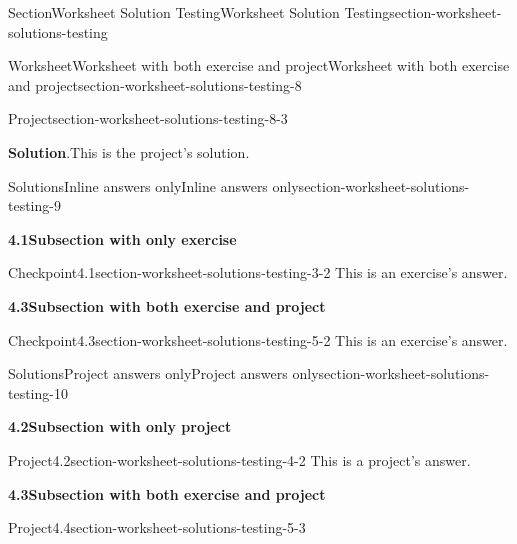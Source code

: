 \documentclass[oneside,10pt,]{article}
\newcommand{\blocktitlefont}{\relax}
\numberwithin{equation}{section}
\begin{document}
\begin{sectionptx}{Section}{Worksheet Solution Testing}{}{Worksheet Solution Testing}{}{}{section-worksheet-solutions-testing}
\begin{worksheet-subsection}{Worksheet}{Worksheet with both exercise and project}{}{Worksheet with both exercise and project}{}{}{section-worksheet-solutions-testing-8}
\begin{project}{Project}{}{section-worksheet-solutions-testing-8-3}
\par\smallskip%
\noindent\textbf{\blocktitlefont Solution}.\hypertarget{section-worksheet-solutions-testing-8-3-3}{}\quad{}This is the project's solution.%
\end{project}%
\end{worksheet-subsection}
\restoregeometry
%
%
\typeout{************************************************}
\typeout{************************************************}
%
\begin{solutions-subsection}{Solutions}{Inline answers only}{}{Inline answers only}{}{}{section-worksheet-solutions-testing-9}
\par\medskip
\noindent\textbf{\normalsize{}4.1\space\textperiodcentered\space{}Subsection with only exercise}
\begin{inlinesolution}{Checkpoint}{4.1}{}{section-worksheet-solutions-testing-3-2}%
\noindent\hypertarget{section-worksheet-solutions-testing-3-2-2-main}{}This is an exercise's answer.%
\end{inlinesolution}%
\par\medskip
\noindent\textbf{\normalsize{}4.3\space\textperiodcentered\space{}Subsection with both exercise and project}
\begin{inlinesolution}{Checkpoint}{4.3}{}{section-worksheet-solutions-testing-5-2}%
\noindent\hypertarget{section-worksheet-solutions-testing-5-2-2-main}{}This is an exercise's answer.%
\end{inlinesolution}%
\end{solutions-subsection}
%
%
\typeout{************************************************}
\typeout{************************************************}
%
\begin{solutions-subsection}{Solutions}{Project answers only}{}{Project answers only}{}{}{section-worksheet-solutions-testing-10}
\par\medskip
\noindent\textbf{\normalsize{}4.2\space\textperiodcentered\space{}Subsection with only project}
\begin{projectsolution}{Project}{4.2}{}{section-worksheet-solutions-testing-4-2}%
\noindent\hypertarget{section-worksheet-solutions-testing-4-2-2-main}{}This is a project's answer.%
\end{projectsolution}%
\par\medskip
\noindent\textbf{\normalsize{}4.3\space\textperiodcentered\space{}Subsection with both exercise and project}
\begin{projectsolution}{Project}{4.4}{}{section-worksheet-solutions-testing-5-3}%

\end{projectsolution}
\end{solutions-subsection}
\end{sectionptx}
\end{document}
